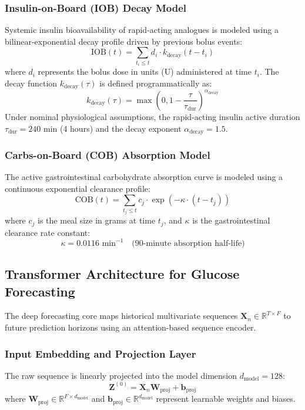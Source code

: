\documentclass[10pt,journal,compsoc,twocolumn]{IEEEtran}
\begin{document}
\subsubsection{Insulin-on-Board (IOB) Decay Model}
Systemic insulin bioavailability of rapid-acting analogues is modeled using a bilinear-exponential decay profile driven by previous bolus events:
\begin{equation}
\text{IOB}(t) = \sum_{t_i \le t} d_i \cdot k_{\text{decay}}(t - t_i)
\end{equation}
where $d_i$ represents the bolus dose in units (U) administered at time $t_i$. The decay function $k_{\text{decay}}(\tau)$ is defined programmatically as:
\begin{equation}
k_{\text{decay}}(\tau) = \max\left(0, 1 - \frac{\tau}{\tau_{\text{dur}}}\right)^{\alpha_{\text{decay}}}
\end{equation}
Under nominal physiological assumptions, the rapid-acting insulin active duration $\tau_{\text{dur}} = 240\text{ min}$ (4 hours) and the decay exponent $\alpha_{\text{decay}} = 1.5$.

\subsubsection{Carbs-on-Board (COB) Absorption Model}
The active gastrointestinal carbohydrate absorption curve is modeled using a continuous exponential clearance profile:
\begin{equation}
\text{COB}(t) = \sum_{t_j \le t} c_j \cdot \exp\left(-\kappa \cdot (t - t_j)\right)
\end{equation}
where $c_j$ is the meal size in grams at time $t_j$, and $\kappa$ is the gastrointestinal clearance rate constant:
\begin{equation}
\kappa = 0.0116 \text{ min}^{-1} \quad \text{(90-minute absorption half-life)}
\end{equation}

\subsection{Transformer Architecture for Glucose Forecasting}
The deep forecasting core maps historical multivariate sequences $\mathbf{X}_n \in \mathbb{R}^{T \times F}$ to future prediction horizons using an attention-based sequence encoder.

\subsubsection{Input Embedding and Projection Layer}
The raw sequence is linearly projected into the model dimension $d_{\text{model}} = 128$:
\begin{equation}
\mathbf{Z}^{(0)} = \mathbf{X}_n \mathbf{W}_{\text{proj}} + \mathbf{b}_{\text{proj}}
\end{equation}
where $\mathbf{W}_{\text{proj}} \in \mathbb{R}^{F \times d_{\text{model}}}$ and $\mathbf{b}_{\text{proj}} \in \mathbb{R}^{d_{\text{model}}}$ represent learnable weights and biases.
\end{document}
